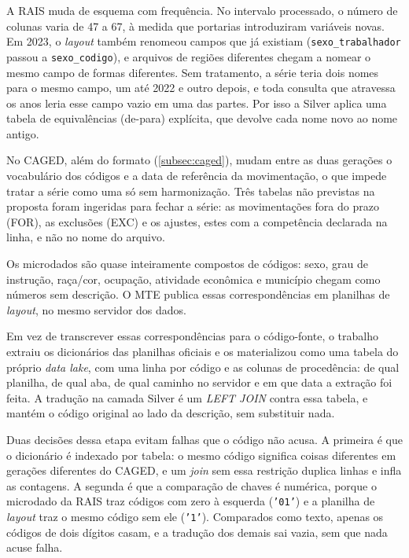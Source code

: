 A RAIS muda de esquema com frequência. No intervalo processado, o número de colunas varia de 47 a 67, à medida que portarias introduziram variáveis novas. Em 2023, o \textit{layout} também renomeou campos que já existiam (\texttt{sexo\_trabalhador} passou a \texttt{sexo\_codigo}), e arquivos de regiões diferentes chegam a nomear o mesmo campo de formas diferentes. Sem tratamento, a série teria dois nomes para o mesmo campo, um até 2022 e outro depois, e toda consulta que atravessa os anos leria esse campo vazio em uma das partes. Por isso a Silver aplica uma tabela de equivalências (de-para) explícita, que devolve cada nome novo ao nome antigo.

No CAGED, além do formato (\autoref{subsec:caged}), mudam entre as duas gerações o vocabulário dos códigos e a data de referência da movimentação, o que impede tratar a série como uma só sem harmonização. Três tabelas não previstas na proposta foram ingeridas para fechar a série: as movimentações fora do prazo (FOR), as exclusões (EXC) e os ajustes, estes com a competência declarada na linha, e não no nome do arquivo.

\label{subsec:dicionarios}

Os microdados são quase inteiramente compostos de códigos: sexo, grau de instrução, raça/cor, ocupação, atividade econômica e município chegam como números sem descrição. O MTE publica essas correspondências em planilhas de \textit{layout}, no mesmo servidor dos dados.

Em vez de transcrever essas correspondências para o código-fonte, o trabalho extraiu os dicionários das planilhas oficiais e os materializou como uma tabela do próprio \textit{data lake}, com uma linha por código e as colunas de procedência: de qual planilha, de qual aba, de qual caminho no servidor e em que data a extração foi feita. A tradução na camada Silver é um \textit{LEFT JOIN} contra essa tabela, e mantém o código original ao lado da descrição, sem substituir nada.

Duas decisões dessa etapa evitam falhas que o código não acusa. A primeira é que o dicionário é indexado por tabela: o mesmo código significa coisas diferentes em gerações diferentes do CAGED, e um \textit{join} sem essa restrição duplica linhas e infla as contagens. A segunda é que a comparação de chaves é numérica, porque o microdado da RAIS traz códigos com zero à esquerda (\texttt{'01'}) e a planilha de \textit{layout} traz o mesmo código sem ele (\texttt{'1'}). Comparados como texto, apenas os códigos de dois dígitos casam, e a tradução dos demais sai vazia, sem que nada acuse falha.

